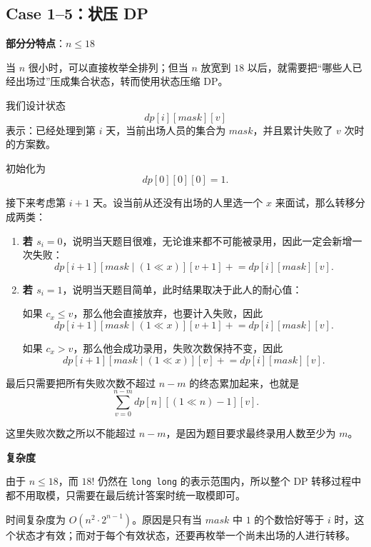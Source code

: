 \documentclass{book}
\newcommand{\code}[1]{\colorbox{codebg}{\texttt{#1}}}  %
\begin{document}
\subsection{Case 1--5：状压 DP}

\textbf{部分分特点}：$n \le 18$

当 $n$ 很小时，可以直接枚举全排列；但当 $n$ 放宽到 $18$ 以后，就需要把“哪些人已经出场过”压成集合状态，转而使用状态压缩 DP。

我们设计状态
\[
dp[i][mask][v]
\]
表示：已经处理到第 $i$ 天，当前出场人员的集合为 $mask$，并且累计失败了 $v$ 次时的方案数。

初始化为
\[
dp[0][0][0] = 1.
\]

接下来考虑第 $i+1$ 天。设当前从还没有出场的人里选一个 $x$ 来面试，那么转移分成两类：

\begin{enumerate}[itemsep=2pt, topsep=2pt, parsep=0pt, partopsep=0pt]
    \item \textbf{若 $s_i = 0$}，说明当天题目很难，无论谁来都不可能被录用，因此一定会新增一次失败：
    \[
    dp[i+1][mask \mid (1 \ll x)][v+1] \mathrel{+}= dp[i][mask][v].
    \]

    \item \textbf{若 $s_i = 1$}，说明当天题目简单，此时结果取决于此人的耐心值：
    
    \quad 如果 $c_x \le v$，那么他会直接放弃，也要计入失败，因此
    \[
    dp[i+1][mask \mid (1 \ll x)][v+1] \mathrel{+}= dp[i][mask][v].
    \]
    
    \quad 如果 $c_x > v$，那么他会成功录用，失败次数保持不变，因此
    \[
    dp[i+1][mask \mid (1 \ll x)][v] \mathrel{+}= dp[i][mask][v].
    \]
\end{enumerate}

最后只需要把所有失败次数不超过 $n-m$ 的终态累加起来，也就是
\[
\sum_{v=0}^{n-m} dp[n][(1 \ll n)-1][v].
\]

这里失败次数之所以不能超过 $n-m$，是因为题目要求最终录用人数至少为 $m$。

\par\medskip
\noindent\textbf{复杂度}
\par\medskip
由于 $n \le 18$，而 $18!$ 仍然在 \code{long long} 的表示范围内，所以整个 DP 转移过程中都不用取模，只需要在最后统计答案时统一取模即可。

时间复杂度为 $O(n^2 \cdot 2^{n-1})$。原因是只有当 $mask$ 中 $1$ 的个数恰好等于 $i$ 时，这个状态才有效；而对于每个有效状态，还要再枚举一个尚未出场的人进行转移。
\end{document}
